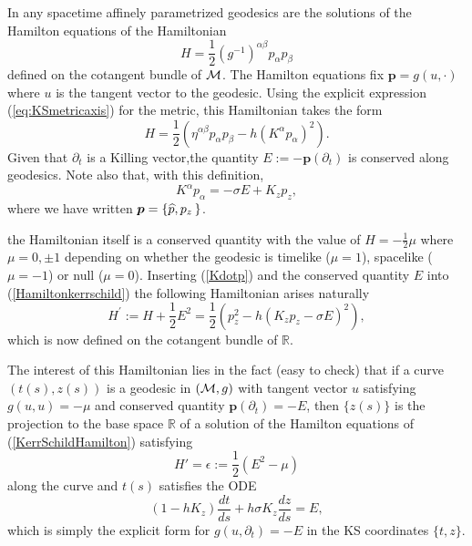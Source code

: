 \begin{Proof}
In any spacetime affinely parametrized geodesics are the solutions of the Hamilton equations of the Hamiltonian
\begin{equation}
H=\frac{1}{2}(g^{-1})^{\alpha \beta} p_\alpha p_\beta
\end{equation}
defined on the cotangent bundle of ${\mathcal M}$. The Hamilton equations fix $\bm{p}= g (u, \cdot)$ where $u$ is  the tangent vector to the geodesic. Using  the explicit expression (\ref{eq:KSmetricaxis}) for the metric, this Hamiltonian takes the form
\begin{equation}
\label{Hamiltonkerrschild} 
H= \frac{1}{2} \left(
\eta^{\alpha \beta} p_\alpha p_\beta -  h (K^\alpha p_\alpha)^2
\right).
\end{equation}
Given that $\partial_t$ is a Killing vector,the quantity $E := - \bm{p} (\partial_t)$ is conserved along geodesics.
Note also that, with this definition,
\begin{equation}
\label{Kdotp}
K^{\alpha} p_{\alpha} = - \sigma E  + K_z p_z,
\end{equation}
where we have written $\mbox{\boldmath $p$} = \{ \widehat{p},
p_z \, \}$.

the Hamiltonian itself is a conserved quantity with the value of $H=-\frac{1}{2} \mu$ where $\mu= {0,\pm 1}$ depending on whether the geodesic is timelike ($\mu=1$), spacelike ($\mu=-1$) or null
($\mu=0$). Inserting (\ref{Kdotp}) and the conserved quantity $E$ into (\ref{Hamiltonkerrschild}) the following Hamiltonian arises naturally
\begin{equation}
\label{KerrSchildHamilton}
H^{\prime} := H + \frac{1}{2} E^2 = 
\frac{1}{2} \left( p_z^2	- h \left( K_z p_z - \sigma E \right)^2 \right),
\end{equation} 
which is now defined on the cotangent bundle of $\mathbb{R}$. 

The interest of this Hamiltonian lies in the fact (easy to check) that if a curve $(t (s), z(s) )$ is a geodesic
in $({\mathcal M},g)$ with tangent vector $u$ satisfying $g (u,u) = -\mu$ and conserved quantity $\bm{p} (\partial_t ) = -E$, then $\{ z(s) \}$ is the projection to the base
space $\mathbb{R}$ of a solution of the Hamilton equations 
of (\ref{KerrSchildHamilton}) satisfying
\begin{equation}\label{HamiltonianEnergyMu}
H' = \epsilon := \frac{1}{2} \left ( E^2 - \mu \right )
\end{equation}
along the curve and $t(s)$ satisfies the ODE
\begin{equation}
\left (  1 -  h K_z  \right ) \frac{d t}{ds}
+ h \sigma K_z \frac{d z}{ds} = E,
\label{eq:conservedenergy}
\end{equation}
which is simply the explicit form for $g(u, \partial_t) = -E$ in the \gls{KS} coordinates $\{ t, z \}$. 


\end{Proof}
